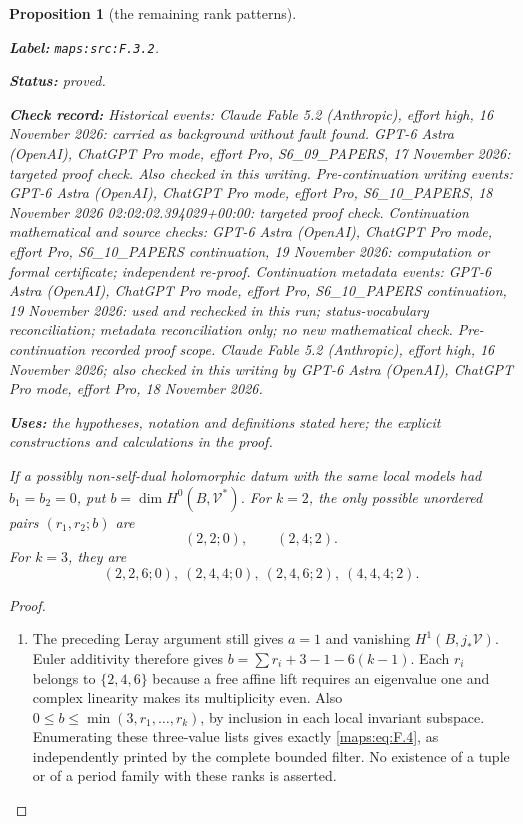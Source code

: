 \documentclass[11pt,a4paper]{article}
\newtheorem{proposition}[proposition]{Proposition}
\theoremstyle{definition}
\newcommand{\StatementRecord}[4]{\par\smallskip\begingroup\upshape\raggedright\noindent\textbf{Label:} \nolinkurl{#1}.\par\noindent\textbf{Status:} #2.\par\noindent\textbf{Check record:} #3.\par\noindent\textbf{Uses:} #4.\par\endgroup\smallskip}
\begin{document}
\begin{proposition}[the remaining rank patterns]\label{maps:src:F.3.2}
\StatementRecord{maps:src:F.3.2}{proved}{Historical events: Claude Fable 5.2 (Anthropic), effort high, 16 November 2026: carried as background without fault found. GPT-6 Astra (OpenAI), ChatGPT Pro mode, effort Pro, S6\_09\_PAPERS, 17 November 2026: targeted proof check. Also checked in this writing. Pre-continuation writing events: GPT-6 Astra (OpenAI), ChatGPT Pro mode, effort Pro, S6\_10\_PAPERS, 18 November 2026 02:02:02.394029+00:00: targeted proof check. Continuation mathematical and source checks: GPT-6 Astra (OpenAI), ChatGPT Pro mode, effort Pro, S6\_10\_PAPERS continuation, 19 November 2026: computation or formal certificate; independent re-proof. Continuation metadata events: GPT-6 Astra (OpenAI), ChatGPT Pro mode, effort Pro, S6\_10\_PAPERS continuation, 19 November 2026: used and rechecked in this run; status-vocabulary reconciliation; metadata reconciliation only; no new mathematical check. \emph{Pre-continuation recorded proof scope.} Claude Fable 5.2 (Anthropic), effort high, 16 November 2026; also checked in this writing by GPT-6 Astra (OpenAI), ChatGPT Pro mode, effort Pro, 18 November 2026}{the hypotheses, notation and definitions stated here; the explicit constructions and calculations in the proof}


If a possibly non-self-dual holomorphic datum with the same
local models had $b_1=b_2=0$, put
$b=\dim H^0(B,\mathcal V^*)$.  For $k=2$, the only possible
unordered pairs $(r_1,r_2;b)$ are
\[
 (2,2;0),\qquad(2,4;2).
\]
For $k=3$, they are
\[
 (2,2,6;0),\ (2,4,4;0),\ (2,4,6;2),\ (4,4,4;2).
 \tag{F.4}\label{maps:eq:F.4}
\]

\end{proposition}


\begin{proof}
\begin{enumerate}[label=\arabic*.]
\item The preceding Leray argument still gives $a=1$ and vanishing
$H^1(B,j_*\mathcal V)$.  Euler additivity therefore gives
$b=\sum r_i+3-1-6(k-1)$.  Each $r_i$ belongs to
$\{2,4,6\}$ because a free affine lift requires an eigenvalue
one and complex linearity makes its multiplicity even.
Also $0\leq b\leq\min(3,r_1,\ldots,r_k)$, by inclusion in
each local invariant subspace.  Enumerating these three-value
lists gives exactly \eqref{maps:eq:F.4}, as independently printed by the
complete bounded filter.  No existence of a tuple or of a
period family with these ranks is asserted.

\end{enumerate}
\end{proof}
\end{document}

